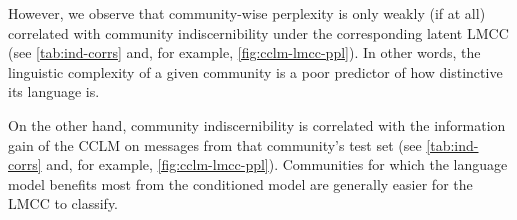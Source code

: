\documentclass[11pt,a4paper]{article}
\newcommand\Ppl{\mathsf{Ppl}}
\newcommand\IG{\mathsf{IG}}
\newcommand\Ind{\mathsf{Ind}}
\begin{document}
However, we observe that community-wise perplexity is only weakly (if at all) 
correlated with community indiscernibility under the corresponding latent 
LMCC (see \cref{tab:ind-corrs} and, for example, \cref{fig:cclm-lmcc-ppl}).
In other words, the linguistic complexity of a given community
is a poor predictor of how distinctive its language is.

\begin{table}
  \centering
  
  \caption{ Pearson's $r$ correlation coefficient between community
    indiscernibility ($\Ind_j$) and two different predictors: CCLM
    perplexity on messages from community $c_j$ ($\Ppl_{M_j}$), and
    CCLM information gain on messages from $c_j$ ($\IG_{M_j}$).  }
  \label{tab:ind-corrs}
\end{table}


\begin{figure*}
  \caption{%
    Mean community indiscernibility (y-axis), 
    in relationship to linguistic complexity (left) and 
    CCLM information gain (right). Shown here for the LSTM
    model with $l_c=1$. See \cref{tab:ind-corrs} for 
    Pearson's r correlations for all models.
  }
  \label{fig:cclm-lmcc-ppl}
\end{figure*}



On the other hand, community indiscernibility is correlated with
the information gain of the CCLM
on messages from that community's test set
(see \cref{tab:ind-corrs} and, for example, \cref{fig:cclm-lmcc-ppl}).
Communities for which the language model benefits most from 
the conditioned model are generally easier for the LMCC to classify.

\end{document}
